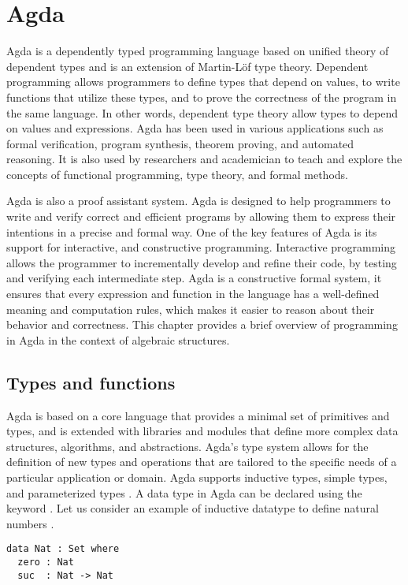 \chapter{Agda}
Agda is a dependently typed programming language based on unified theory of
dependent types and is an extension of Martin-Löf type theory. Dependent
programming allows programmers to define types that depend on values, to write
functions that utilize these types, and to prove the correctness of the program
in the same language. In other words, dependent type theory allow types to
depend on values and expressions. Agda has been used in various applications
such as formal verification, program synthesis, theorem proving, and automated
reasoning. It is also used by researchers and academician to teach and explore
the concepts of functional programming, type theory, and formal methods.

Agda is also a proof assistant system. Agda is designed to help programmers to
write and verify correct and efficient programs by allowing them to express
their intentions in a precise and formal way. One of the key features of Agda is
its support for interactive, and constructive programming. Interactive
programming allows the programmer to incrementally develop and refine their
code, by testing and verifying each intermediate step. Agda is a constructive
formal system, it ensures that every expression and function in the language has
a well-defined meaning and computation rules, which makes it easier to reason
about their behavior and correctness. This chapter provides a brief overview of
programming in Agda in the context of algebraic structures. 

\section{Types and functions}
\label{types}
Agda is based on a core language that provides a minimal set of primitives and
types, and is extended with libraries and modules that define more complex data
structures, algorithms, and abstractions. Agda's type system allows for the
definition of new types and operations that are tailored to the specific needs
of a particular application or domain. Agda supports inductive types, simple
types, and parameterized types \cite{10.1007/978-3-642-03359-9_6}. A data type
in Agda can be declared using the keyword . Let us consider an
example of inductive datatype to define natural numbers .

\label{code:Nat}
\begin{verbatim}
data Nat : Set where
  zero : Nat
  suc  : Nat -> Nat
\end{verbatim}

